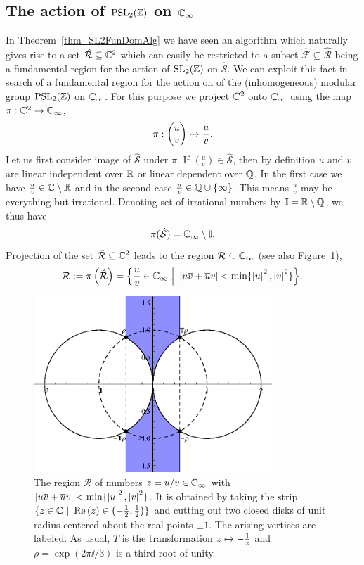 \subsection{The action of $\operatorname{PSL}_{2}(\mathbb{Z})$ on $\mathbb{C}_{\infty}$}

In Theorem~\ref{thm_SL2FunDomAlg} we have seen an algorithm which naturally gives rise to a set $\hat{\mathcal{R}} \subseteq \mathbb{C}^2$ which can easily be restricted to a subset $\hat{\mathcal{F}} \subseteq \hat{\mathcal{R}}$ being a fundamental region for the action of $\operatorname{SL}_{2}(\mathbb{Z})$ on $\hat{\mathcal{S}}$. We can exploit this fact in search of a fundamental region for the action on of the (inhomogeneous) modular group $\operatorname{PSL}_{2}(\mathbb{Z})$ on $\mathbb{C}_{\infty}$. For this purpose we project $\mathbb{C}^2$ onto $\mathbb{C}_{\infty}$ using the map $\pi : \mathbb{C}^2 \to \mathbb{C}_{\infty}$,
\begin{equation}
\pi : \begin{pmatrix}u \\ v\end{pmatrix} \mapsto \frac{u}{v}.
\end{equation}
Let us first consider image of $\hat{\mathcal{S}}$ under $\pi$. If $({}^u_v) \in \hat{\mathcal{S}}$, then by definition $u$ and $v$ are linear independent over $\mathbb{R}$ or linear dependent over $\mathbb{Q}$. In the first case we have $\frac{u}{v} \in \mathbb{C} \setminus \mathbb{R}$ and in the second case $\frac{u}{v} \in \mathbb{Q} \cup \{\infty\}$. This means $\frac{u}{v}$ may be everything but irrational. Denoting set of irrational numbers by $\mathbb{I} = \mathbb{R} \setminus \mathbb{Q}$, we thus have
\begin{equation*}
\pi(\hat{\mathcal{S}}) = \mathbb{C}_{\infty} \setminus \mathbb{I}.
\end{equation*}
Projection of the set $\hat{\mathcal{R}} \subseteq \mathbb{C}^2$ leads to the region $\mathcal{R} \subseteq \mathbb{C}_{\infty}$ (see also Figure~\ref{fig_PSL2MinRegion}),
\begin{equation}
\mathcal{R} := \pi\left(\hat{\mathcal{R}}\right) = 
\Big\{ \frac{u}{v} \in \mathbb{C}_{\infty} \ \Big| \ \left|u\overline{v} + \overline{u}v\right| < \min\{\left|u\right|^2, \left|v\right|^2\} \Big\}.
\end{equation}
\begin{figure}
\centering
\includegraphics[width=0.8\textwidth]{figures/minimal-region}
\caption{The region $\mathcal{R}$ of numbers $z = u/v \in \mathbb{C}_{\infty}$ with $\left|u\overline{v} + \overline{u}v\right| < \min\{\left|u\right|^2,\left|v\right|^2\}$. It is obtained by taking the strip $\{ z \in \mathbb{C} \ | \ \operatorname{Re}\left(z\right) \in \left(-\frac{1}{2},\frac{1}{2}\right) \}$  and cutting out two closed disks of unit radius centered about the real points $\pm 1$. The arising vertices are labeled. As usual, $T$ is the transformation $z \mapsto -\frac{1}{z}$ and $\rho = \exp(2 \pi \ii / 3)$ is a third root of unity.}
\label{fig_PSL2MinRegion}
\end{figure}
